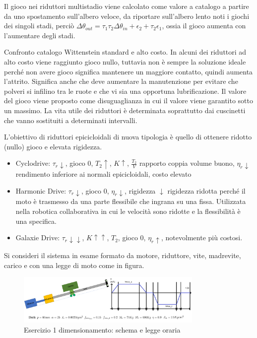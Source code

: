 Il gioco nei riduttori multistadio viene calcolato come valore a catalogo a partire da uno spostamento sull'albero veloce, da riportare sull'albero lento noti i giochi dei singoli stadi, perciò \( \Delta \theta_{out} = \tau_1\tau_2\Delta \theta_{in} + \epsilon_2 +\tau_2\epsilon_1 \), ossia il gioco aumenta con l'aumentare degli stadi.

Confronto catalogo Wittenstein standard e alto costo. In alcuni dei riduttori ad alto costo viene raggiunto gioco nullo, tuttavia non è sempre la soluzione ideale perché non avere gioco significa mantenere un maggiore contatto, quindi aumenta l'attrito. Significa anche che deve aumentare la manutenzione per evitare che polveri si infilino tra le ruote e che vi sia una opportuna lubrificazione. 
Il valore del gioco viene proposto come disuguaglianza in cui il valore viene garantito sotto un massimo.
La vita utile dei riduttori è determinata soprattutto dai cuscinetti che vanno sostituiti a determinati intervalli.

L'obiettivo di riduttori epicicloidali di nuova tipologia è quello di ottenere ridotto (nullo) gioco e elevata rigidezza.
\begin{itemize}
    \item Cyclodrive: \( \tau_r \downarrow \), gioco 0, \( T_2 \uparrow \), \( K \uparrow \), \( \frac{T_2}{V} \) rapporto coppia volume buono, \( \eta_r \downarrow \) rendimento inferiore ai normali epicicloidali, costo elevato
    \item Harmonic Drive: \( \tau_r \downarrow \), gioco 0, \( \eta_r \downarrow \), rigidezza \( \downarrow \) rigidezza ridotta perché il moto è trasmesso da una parte flessibile che ingrana su una fissa. Utilizzata nella robotica collaborativa in cui le velocità sono ridotte e la flessibilità è una specifica.
    \item Galaxie Drive: \( \tau_r \downarrow\downarrow\), \( K \uparrow\uparrow \), \( T_2 \), gioco 0, \( \eta_r \uparrow \), notevolmente più costosi.
\end{itemize}

Si consideri il sistema in esame formato da motore, riduttore, vite, madrevite, carico e con una legge di moto come in figura.

\begin{figure}[h]
    \centering
    \includegraphics[width=0.8\textwidth]{Immagini/esercizio1_dim_rid_vite.png}
    \caption{Esercizio 1 dimensionamento: schema e legge oraria}
\end{figure}

